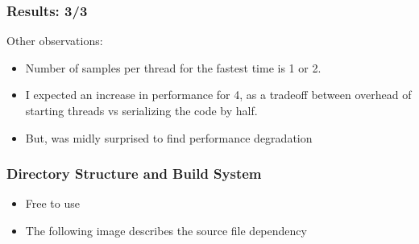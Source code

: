 \documentclass[mathserif]{beamer}
\begin{document}
\begin{frame}                                                                                                                                                                          
\frametitle{Results: 3/3}
Other observations:
\begin{itemize}
\item Number of samples per thread for the fastest time is 1 or 2.  
\item I expected an increase in performance for 4, as a tradeoff between overhead of starting threads vs serializing the code by half.  
\item But, was midly surprised to find performance degradation 
\end{itemize}
\end{frame}             

\begin{frame}                                                                                                                                                                          
\frametitle{Directory Structure and Build System}
\begin{center}
\begin{itemize}
\item Free to use
\item The following image describes the source file dependency 
\end{itemize}
\end{center}
\end{frame}             
\end{document}
